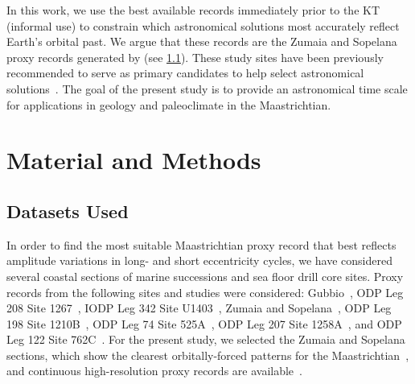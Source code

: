 \documentclass[]{agujournal2019}
\newcommand{\ma}[1]{Ma\(_{405}\)#1} %
\newcommand{\rez}{\textcolor{magenta}}
\newcommand{\ijk}{\textcolor{blue}}
\begin{document}
In this work, we use the best available records immediately prior to the \gls{KT} (informal use) to constrain which astronomical solutions most accurately reflect Earth's orbital past.
We argue that these records are the Zumaia and Sopelana proxy records generated by  (see \cref{sec:data}).
These study sites have been previously recommended to serve as primary candidates to help select astronomical solutions~\cite{Dinares-Turell2013}.
The goal of the present study is to provide an astronomical time scale for applications in geology and paleoclimate in the Maastrichtian.


\section{Material and Methods}\label{sec:mm}


\subsection{Datasets Used}\label{sec:data}

In order to find the most suitable Maastrichtian proxy record that best reflects amplitude variations in long- and short eccentricity cycles,
we have considered several coastal sections of marine successions and sea floor drill core sites.
Proxy records from the following sites and studies were considered:
Gubbio~\cite{Voigt2012,Sinnesael2016}, %
ODP Leg 208 Site 1267~\cite{Westerhold2008,Husson2011}, %
IODP Leg 342 Site U1403~\cite{Batenburg2018}, %
Zumaia and Sopelana~\cite{tenKateSprenger1993,Batenburg2012,Batenburg2014,Dinares-Turell2013}, %
ODP Leg 198 Site 1210B~\cite{Jung2012,Kim2022}, %
ODP Leg 74 Site 525A~\cite{Husson2011}, %
ODP Leg 207 Site 1258A~\cite{Husson2011}, %
and ODP Leg 122 Site 762C~\cite{Husson2011,Thibault2012}. %
For the present study, we selected the Zumaia and Sopelana
 sections,
which show the clearest orbitally-forced patterns for the Maastrichtian~\cite{tenKateSprenger1993,Batenburg2012,Dinares-Turell2013},
and continuous high-resolution proxy records are available~\cite{Batenburg2012,Batenburg2014}.
\end{document}
